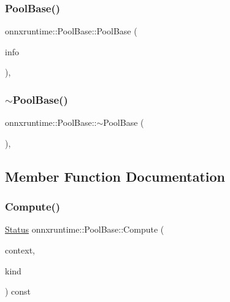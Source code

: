 \subsubsection{\texorpdfstring{Pool\+Base()}{PoolBase()}}
{\footnotesize\ttfamily onnxruntime\+::\+Pool\+Base\+::\+Pool\+Base (\begin{DoxyParamCaption}\item[{const \mbox{\hyperlink{classonnxruntime_1_1OpKernelInfo}{Op\+Kernel\+Info}} \&}]{info }\end{DoxyParamCaption})\hspace{0.3cm}{\ttfamily [inline]}, {\ttfamily [protected]}}

\mbox{\label{classonnxruntime_1_1PoolBase_a170ff68bb0fefc4f2bf365a35a7691d3}} 
\subsubsection{\texorpdfstring{$\sim$\+Pool\+Base()}{~PoolBase()}}
{\footnotesize\ttfamily onnxruntime\+::\+Pool\+Base\+::$\sim$\+Pool\+Base (\begin{DoxyParamCaption}{ }\end{DoxyParamCaption})\hspace{0.3cm}{\ttfamily [inline]}, {\ttfamily [protected]}}



\subsection{Member Function Documentation}
\mbox{\label{classonnxruntime_1_1PoolBase_a231b67fa3cae697f680c87d55deab443}} 
\subsubsection{\texorpdfstring{Compute()}{Compute()}}
{\footnotesize\ttfamily \mbox{\hyperlink{classonnxruntime_1_1common_1_1Status}{Status}} onnxruntime\+::\+Pool\+Base\+::\+Compute (\begin{DoxyParamCaption}\item[{\mbox{\hyperlink{classonnxruntime_1_1OpKernelContext}{Op\+Kernel\+Context}} $\ast$}]{context,  }\item[{\mbox{\hyperlink{mlas_8h_a308be0f1e44b0324610000287f348222}{M\+L\+A\+S\+\_\+\+P\+O\+O\+L\+I\+N\+G\+\_\+\+K\+I\+ND}}}]{kind }\end{DoxyParamCaption}) const\hspace{0.3cm}{\ttfamily [protected]}}

